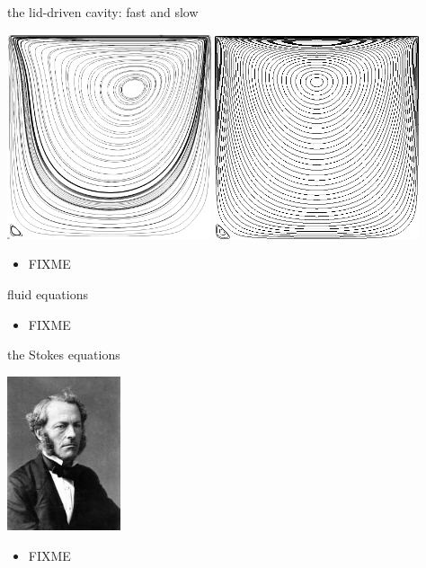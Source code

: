 \documentclass[10pt,hyperref,dvipsnames]{beamer}
\begin{document}
\begin{frame}{the lid-driven cavity: fast and slow}

\begin{center}
\includegraphics[width=0.45\textwidth]{figs/nscavity.png} \qquad \includegraphics[width=0.45\textwidth]{figs/eddies1.png}
\end{center}

\begin{itemize}
\item FIXME
\end{itemize}
\end{frame}


\begin{frame}{fluid equations}

\begin{itemize}
\item FIXME
\end{itemize}
\end{frame}


\begin{frame}{the Stokes equations}

\hfill \includegraphics[width=0.25\textwidth]{figs/people/gstokes.jpg}

\vspace{-20mm}
\begin{itemize}
\item FIXME
\end{itemize}
\end{frame}
\end{document}
